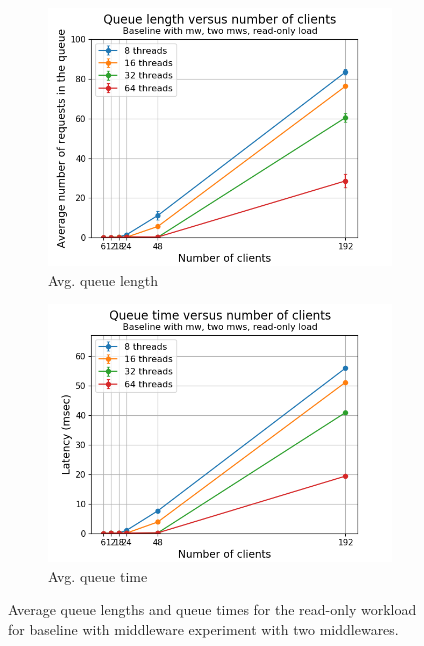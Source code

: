 \documentclass[11pt,a4paper]{article}
\begin{document}
\begin{figure}[h]
\centering
\begin{subfigure}{.5\textwidth}
  \centering
  \includegraphics[width=1.0\linewidth,trim={5px 0px 20px 0px},clip]{img/plot/mwb2-ro-qlen_mw.png}
  \caption{Avg. queue length}
  \label{fig:mwb2-ro-qlen_mw}
\end{subfigure}%
\begin{subfigure}{.5\textwidth}
  \centering
  \includegraphics[width=1.0\linewidth,trim={5px 0px 20px 0px},clip]{img/plot/mwb2-ro-qtime_mw.png}
  \caption{Avg. queue time}
  \label{fig:mwb2-ro-qtime_mw}
\end{subfigure}
\caption{Average queue lengths and queue times for the read-only workload for baseline with middleware experiment with two middlewares.}
\label{fig:mwb2-ro-qstats}
\end{figure}
\end{document}
